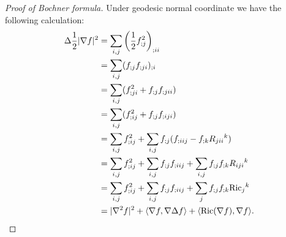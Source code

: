 \begin{proof}[Proof of Bochner formula]
    Under geodesic normal coordinate we have the following calculation:
    \begin{align*}
        \Delta\frac{1}{2}|\nabla f|^2&=\sum_{i,j}\left(\frac{1}{2}f_{;j}^2\right)_{;ii}\\
        &=\sum_{i,j}(f_{;j}f_{;ji})_{;i}\\
        &=\sum_{i,j}(f_{;ji}^2+f_{;j}f_{;jii})\\
        &=\sum_{i,j}(f_{;ij}^2+f_{;j}f_{;iji})\\
        &=\sum_{i,j}f_{;ij}^2+\sum_{i,j}f_{;j}(f_{;iij}-f_{;k}\R{k}{j}{i}{i})\\
        &=\sum_{i,j}f_{;ij}^2+\sum_{i,j}f_{;j}f_{;iij}+\sum_{i,j}f_{;j}f_{;k}\R{k}{i}{j}{i}\\
        &=\sum_{i,j}f_{;ij}^2+\sum_{i,j}f_{;j}f_{;iij}+\sum_{j}f_{;j}f_{;k}\Ricij{k}{j}\\
        &=|\nabla^2f|^2+\langle\nabla f,\nabla\Delta f\rangle+\langle\Ric(\nabla f),\nabla f\rangle.\qedhere
    \end{align*}
\end{proof}